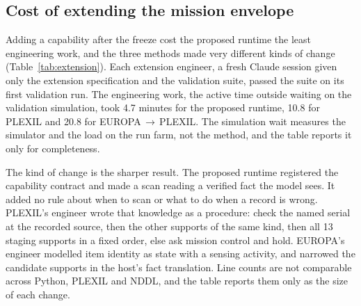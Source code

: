 \begin{table}[t]
  \centering
  \caption{Constraint violations counted by the external evaluator from simulator truth, identically for every method.}
  \label{tab:violations}
  \small
  \resizebox{\columnwidth}{!}{}
\end{table}

\subsection{Cost of extending the mission envelope}
\label{sec:results-exp2}

Adding a capability after the freeze cost the proposed runtime the least engineering work, and the three methods made
very different kinds of change (Table~\ref{tab:extension}). Each extension engineer, a fresh Claude session given only
the extension specification and the validation suite, passed the suite on its first validation run. The engineering
work, the active time outside waiting on the validation simulation, took 4.7 minutes for the proposed runtime, 10.8
for PLEXIL and 20.8 for EUROPA\,$\rightarrow$\,PLEXIL. The simulation wait measures the simulator and the load on the
run farm, not the method, and the table reports it only for completeness.

The kind of change is the sharper result. The proposed runtime registered the capability contract and made a scan
reading a verified fact the model sees. It added no rule about when to scan or what to do when a record is wrong.
PLEXIL's engineer wrote that knowledge as a procedure: check the named serial at the recorded source, then the other
supports of the same kind, then all 13 staging supports in a fixed order, else ask mission control and hold.
EUROPA's engineer modelled item identity as state with a sensing activity, and narrowed the candidate supports in the
host's fact translation. Line counts are not comparable across Python, PLEXIL and NDDL, and the table reports them
only as the size of each change.

